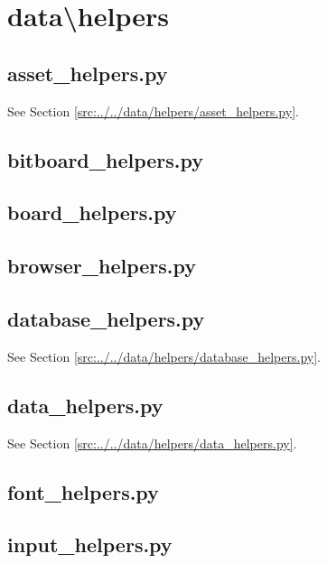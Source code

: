 \documentclass[../main/main.tex]{subfiles}
\begin{document}
\section{data\textbackslash helpers}
\subsection{asset\_helpers.py}
See Section \ref{src:../../data/helpers/asset_helpers.py}.

\subsection{bitboard\_helpers.py}

\label{src:data/helpers/bitboard_helpers.py}

\subsection{board\_helpers.py}

\label{src:data/helpers/board_helpers.py}

\subsection{browser\_helpers.py}

\label{src:data/helpers/browser_helpers.py}

\subsection{database\_helpers.py}
See Section \ref{src:../../data/helpers/database_helpers.py}.

\subsection{data\_helpers.py}
See Section \ref{src:../../data/helpers/data_helpers.py}.

\subsection{font\_helpers.py}

\label{src:data/helpers/font_helpers.py}

\subsection{input\_helpers.py}

\label{src:data/helpers/input_helpers.py}
\end{document}
